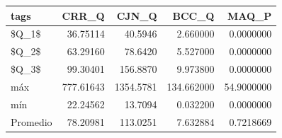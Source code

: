 
\begin{tabular}[t]{l|r|r|r|r}
\hline
tags & CRR\_Q & CJN\_Q & BCC\_Q & MAQ\_P\\
\hline
\$Q\_1\$ & 36.75114 & 40.5946 & 2.660000 & 0.0000000\\
\hline
\$Q\_2\$ & 63.29160 & 78.6420 & 5.527000 & 0.0000000\\
\hline
\$Q\_3\$ & 99.30401 & 156.8870 & 9.973800 & 0.0000000\\
\hline
máx & 777.61643 & 1354.5781 & 134.662000 & 54.9000000\\
\hline
mín & 22.24562 & 13.7094 & 0.032200 & 0.0000000\\
\hline
Promedio & 78.20981 & 113.0251 & 7.632884 & 0.7218669\\
\hline
\end{tabular}
